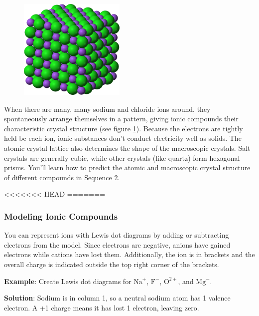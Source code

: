\begin{figure}
\noindent\includegraphics[width=2in]{NaCl_lattice.png}
\caption{}
\label{fig:NaCl_lattice}
\end{figure}

When there are many, many sodium and chloride ions around, they spontaneously 
arrange themselves in a pattern, giving ionic compounds their characteristic 
crystal structure (see figure \ref{fig:NaCl_lattice}). Because the electrons are 
tightly held be each ion, ionic substances don't conduct electricity well as 
solids. The atomic crystal lattice also determines the shape of the macroscopic 
crystals. Salt crystals are generally cubic, while other crystals (like quartz) 
form hexagonal prisms. You'll learn how to predict the atomic and macroscopic 
crystal structure of different compounds in Sequence 2. 

<<<<<<< HEAD
=======
\subsubsection{Modeling Ionic Compounds}
You can represent ions with Lewis dot diagrams by adding or subtracting electrons 
from the model. Since electrons are negative, anions have gained electrons while 
cations have lost them. Additionally, the ion is in brackets and the overall 
charge is indicated outside the top right corner of the brackets. 

\textbf{Example}: Create Lewis dot diagrams for $\text{Na}^{+}$, $\text{F}^{-}$, 
$\text{O}^{2+}$, and $\text{Mg}^{-}$.

\textbf{Solution}: Sodium is in column 1, so a neutral sodium atom has 1 valence 
electron. A +1 charge means it has lost 1 electron, leaving zero.

\begin{center}
\end{center}

